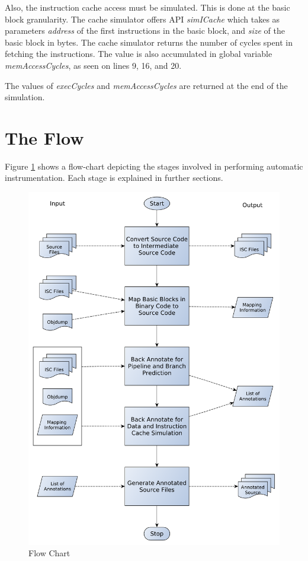 Also, the instruction cache access must be simulated. This is done at the basic block granularity. The cache simulator offers API \emph{simICache} which takes as parameters \emph{address} of the first instructions in the basic block, and \emph{size} of the basic block in bytes. The cache simulator returns the number of cycles spent in fetching the instructions. The value is also accumulated in global variable \emph{memAccessCycles}, as seen on lines 9, 16, and 20.

The values of \emph{execCycles} and \emph{memAccessCycles} are returned at the end of the simulation.

\section{The Flow}

Figure \ref{fig:hcsFlowChart} shows a flow-chart depicting the stages involved in performing automatic instrumentation. Each stage is explained in further sections.

\begin{figure}[h]
\center
\includegraphics[width=.78\textwidth]{figures/HCS_FlowChart.pdf}
\caption{Flow Chart}
\label{fig:hcsFlowChart}
\end{figure}

